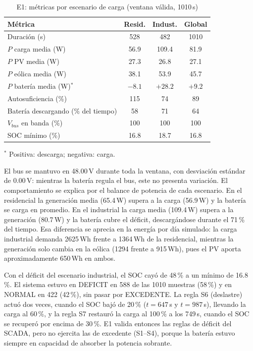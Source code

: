 \documentclass[conference]{IEEEtran}
\begin{document}
\begin{table}[H]
\caption{E1: métricas por escenario de carga (ventana válida, 1010\,s)}
\label{tab:e1}
\centering
\scriptsize
\begin{tabular}{|l|c|c|c|}
\hline
\textbf{Métrica} & \textbf{Resid.} & \textbf{Indust.} & \textbf{Global} \\
\hline
Duración (s) & 528 & 482 & 1010 \\
\hline
$P$ carga media (W) & 56.9 & 109.4 & 81.9 \\
\hline
$P$ PV media (W) & 27.3 & 26.8 & 27.1 \\
\hline
$P$ eólica media (W) & 38.1 & 53.9 & 45.7 \\
\hline
$P$ batería media (W)$^{*}$ & $-8.1$ & $+28.2$ & $+9.2$ \\
\hline
Autosuficiencia (\%) & 115 & 74 & 89 \\
\hline
Batería descargando (\% del tiempo) & 58 & 71 & 64 \\
\hline
$V_{bus}$ en banda (\%) & 100 & 100 & 100 \\
\hline
SOC mínimo (\%) & 16.8 & 18.7 & 16.8 \\
\hline
\end{tabular}

\vspace{2pt}
{\scriptsize $^{*}$ Positiva: descarga; negativa: carga.}
\end{table}

El bus se mantuvo en 48.00\,V durante toda la ventana, con desviación estándar de 0.00\,V: mientras la batería regula el bus, este no presenta variación. El comportamiento se explica por el balance de potencia de cada escenario. En el residencial la generación media (65.4\,W) supera a la carga (56.9\,W) y la batería se carga en promedio. En el industrial la carga media (109.4\,W) supera a la generación (80.7\,W) y la batería cubre el déficit, descargándose durante el 71\,\% del tiempo. Esa diferencia se aprecia en la energía por día simulado: la carga industrial demanda 2625\,Wh frente a 1364\,Wh de la residencial, mientras la generación solo cambia en la eólica (1294 frente a 915\,Wh), pues el PV aporta aproximadamente 650\,Wh en ambos.

Con el déficit del escenario industrial, el SOC cayó de 48\,\% a un mínimo de 16.8\,\%. El sistema estuvo en DEFICIT en 588 de las 1010 muestras (58\,\%) y en NORMAL en 422 (42\,\%), sin pasar por EXCEDENTE. La regla S6 (deslastre) actuó dos veces, cuando el SOC bajó de 20\,\% ($t=647$\,s y $t=987$\,s), llevando la carga al 60\,\%, y la regla S7 restauró la carga al 100\,\% a los 749\,s, cuando el SOC se recuperó por encima de 30\,\%. E1 valida entonces las reglas de déficit del SCADA, pero no ejercita las de excedente (S1--S4), porque la batería estuvo siempre en capacidad de absorber la potencia sobrante.
\end{document}
